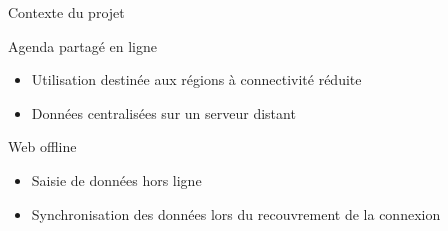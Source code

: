 \author{Martin \textsc{Gaborit}}
\begin{frame}{Contexte du projet}
 \begin{block}{Agenda partagé en ligne}
  \begin{itemize}
   \item Utilisation destinée aux régions à connectivité réduite
   \item Données centralisées sur un serveur distant
  \end{itemize}
 \end{block}
 \begin{block}{Web offline}
  \begin{itemize}
   \item Saisie de données hors ligne
   \item Synchronisation des données lors du recouvrement de la connexion
  \end{itemize}
 \end{block}
\end{frame}
